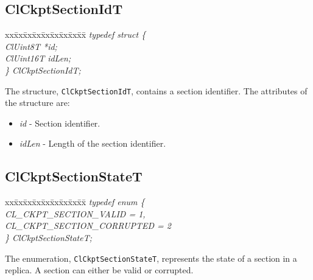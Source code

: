\begin{flushleft}
\subsection{ClCkptSectionIdT}
\begin{tabbing}
xx\=xx\=xx\=xx\=xx\=xx\=xx\=xx\=xx\=\kill
\textit{typedef struct \{}\\
\>\>\>\>\textit{ClUint8T *id;}\\
\>\>\>\>\textit{ClUint16T idLen;}\\
\textit{\} ClCkptSectionIdT;}\end{tabbing}
The structure, {\tt{ClCkptSectionIdT}}, contains a section identifier. The attributes of the structure are:
\begin{itemize}
\item
\textit{id} - Section identifier.
\item
\textit{idLen} - Length of the section identifier.
\end{itemize}


\subsection{ClCkptSectionStateT}
\begin{tabbing}
xx\=xx\=xx\=xx\=xx\=xx\=xx\=xx\=xx\=\kill
\textit{typedef enum \{}\\
\>\>\>\>\textit{CL\_CKPT\_SECTION\_VALID            = 1,}\\
\>\>\>\>\textit{CL\_CKPT\_SECTION\_CORRUPTED = 2}\\
\textit{\} ClCkptSectionStateT;}\end{tabbing}
The enumeration, {\tt{ClCkptSectionStateT}}, represents the state of a section in a replica. A section can either be valid or corrupted.



\end{flushleft}
